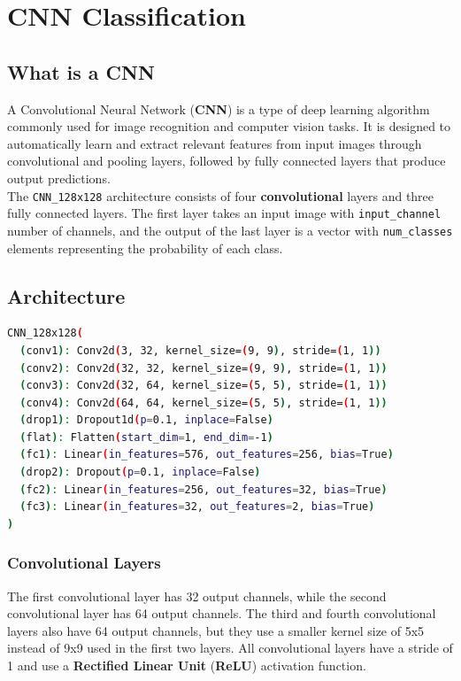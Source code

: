 \documentclass{report}
\begin{document}
\chapter{CNN Classification}
\section{What is a CNN}
A Convolutional Neural Network (\textbf{CNN}) is a type of deep learning algorithm commonly used for image recognition and computer vision tasks. It is designed to automatically learn and extract relevant features from input images through convolutional and pooling layers, followed by fully connected layers that produce output predictions. \\
The \texttt{CNN\_128x128} architecture consists of four \textbf{convolutional} layers and three fully connected layers. The first layer takes an input image with \texttt{input\_channel} number of channels, and the output of the last layer is a vector with \texttt{num\_classes} elements representing the probability of each class.

\section{Architecture}


\begin{lstlisting}[language=bash]
CNN_128x128(
  (conv1): Conv2d(3, 32, kernel_size=(9, 9), stride=(1, 1))
  (conv2): Conv2d(32, 32, kernel_size=(9, 9), stride=(1, 1))
  (conv3): Conv2d(32, 64, kernel_size=(5, 5), stride=(1, 1))
  (conv4): Conv2d(64, 64, kernel_size=(5, 5), stride=(1, 1))
  (drop1): Dropout1d(p=0.1, inplace=False)
  (flat): Flatten(start_dim=1, end_dim=-1)
  (fc1): Linear(in_features=576, out_features=256, bias=True)
  (drop2): Dropout(p=0.1, inplace=False)
  (fc2): Linear(in_features=256, out_features=32, bias=True)
  (fc3): Linear(in_features=32, out_features=2, bias=True)
)
\end{lstlisting}


\subsection{Convolutional Layers}

The first convolutional layer has 32 output channels, while the second convolutional layer has 64 output channels. The third and fourth convolutional layers also have 64 output channels, but they use a smaller kernel size of 5x5 instead of 9x9 used in the first two layers. All convolutional layers have a stride of 1 and use a \textbf{Rectified Linear Unit} (\textbf{ReLU}) activation function.
\end{document}

